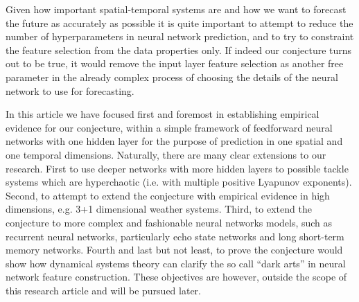 \documentclass[journal]{IEEEtran}
\begin{document}
Given how important spatial-temporal systems are 
and how we want to forecast the future as accurately as possible 
it is quite 
important to attempt to reduce the number of hyperparameters in neural network prediction, and to try to constraint the feature selection from 
the data properties only. If indeed our conjecture turns out to be true, it would remove the input layer feature selection as another free 
parameter in the already complex process of choosing the details of the neural network to use for forecasting.

In this article we have focused first and foremost in establishing empirical evidence for our conjecture, within a simple framework of 
feedforward neural networks with one hidden layer for the purpose of prediction in one spatial and one temporal dimensions. Naturally, 
there are many clear extensions to our research. First to use deeper networks with more hidden 
layers to possible tackle systems which are hyperchaotic (i.e. with multiple positive Lyapunov exponents). Second, to attempt to extend the conjecture with empirical evidence in high 
dimensions, e.g. 3+1 dimensional weather systems. Third, to extend the conjecture to more complex and fashionable
neural networks models, such as recurrent neural networks, particularly echo state networks and long short-term memory networks.
 Fourth and last but not least, to prove the conjecture would show how dynamical systems theory can clarify the so call
 ``dark arts'' in neural network feature construction. These objectives are however, outside the scope
 of this research article and will be pursued later.


%
\end{document}
